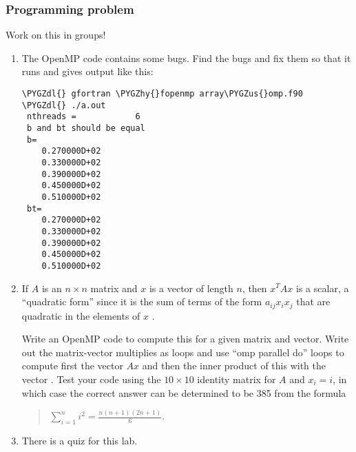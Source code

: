 \documentclass[letterpaper,10pt,english]{sphinxmanual}
\def\PYGZus{\char`\_}
\def\PYGZdl{\char`\$}
\def\PYGZhy{\char`\-}
\begin{document}
\subsubsection{Programming problem}
\label{labs/lab10:programming-problem}
Work on this in groups!
\begin{enumerate}
\item {} 
The OpenMP code  contains some bugs.
Find the bugs and fix them so that it runs and gives output like this:

\begin{Verbatim}[commandchars=\\\{\}]
\PYGZdl{} gfortran \PYGZhy{}fopenmp array\PYGZus{}omp.f90
\PYGZdl{} ./a.out
 nthreads =            6
 b and bt should be equal
 b=
    0.270000D+02
    0.330000D+02
    0.390000D+02
    0.450000D+02
    0.510000D+02
 bt=
    0.270000D+02
    0.330000D+02
    0.390000D+02
    0.450000D+02
    0.510000D+02
\end{Verbatim}

\item {} 
If \(A\) is an \(n \times n\) matrix and \(x\) is a vector of
length \(n\), then \(x^TAx\) is a scalar, a ``quadratic form''
since it is the sum of terms of the form \(a_{ij}x_ix_j\) that are
quadratic in the elements of \(x\) .

Write an OpenMP code to compute this for a given matrix and vector.  Write
out the matrix-vector multiplies as loops and use ``omp parallel do'' loops to
compute first the vector \(Ax\) and then the inner product of this with
the vector .  Test your code using the \(10 \times 10\) identity matrix
for \(A\) and \(x_i = i\), in which case the correct answer can be
determined to be 385 from the formula
\begin{quote}

\(\sum_{i=1}^n i^2 = \frac{n(n+1)(2n+1)}6.\)
\end{quote}

\item {} 
There is a quiz for this lab.

\end{enumerate}
\end{document}
